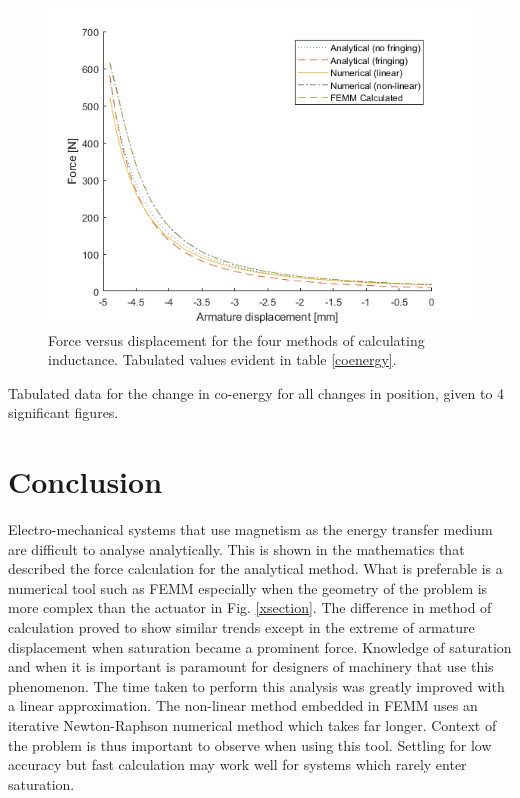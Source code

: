 \documentclass[a4paper]{IEEEtran}
\begin{document}
    \begin{figure}[ht]
        \includegraphics[width = \linewidth]{F-x.png}
        \caption{Force versus displacement for the four methods of calculating inductance. Tabulated values evident in table \ref{coenergy}.}
        \label{forceGraph} 
    \end{figure}

    \begin{table}[ht]
        \centering
        
        \caption{Tabulated data for the change in co-energy for all changes in position, given to 4 significant figures.}
        \label{coenergy}
    \end{table}


\section{Conclusion}
Electro-mechanical systems that use magnetism as the energy transfer medium are difficult to analyse analytically. This is shown in the mathematics that described the force calculation for the analytical method. What is preferable is a numerical tool such as FEMM especially when the geometry of the problem is more complex than the actuator in Fig. \ref{xsection}. The difference in method of calculation proved to show similar trends except in the extreme of armature displacement when saturation became a prominent force. Knowledge of saturation and when it is important is paramount for designers of machinery that use this phenomenon. The time taken to perform this analysis was greatly improved with a linear approximation. The non-linear method embedded in FEMM uses an iterative Newton-Raphson numerical method which takes far longer. Context of the problem is thus important to observe when using this tool. Settling for low accuracy but fast calculation may work well for systems which rarely enter saturation. 
\end{document}
